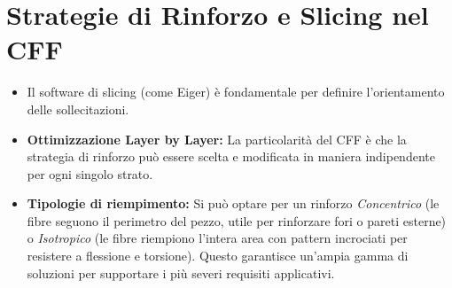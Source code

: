 \section{Strategie di Rinforzo e Slicing nel CFF}
\begin{itemize}
    \item Il software di slicing (come Eiger) è fondamentale per definire l'orientamento delle sollecitazioni.
    \item \textbf{Ottimizzazione Layer by Layer:} La particolarità del CFF è che la strategia di rinforzo può essere scelta e modificata in maniera indipendente per ogni singolo strato.
    \item \textbf{Tipologie di riempimento:} Si può optare per un rinforzo \textit{Concentrico} (le fibre seguono il perimetro del pezzo, utile per rinforzare fori o pareti esterne) o \textit{Isotropico} (le fibre riempiono l'intera area con pattern incrociati per resistere a flessione e torsione). Questo garantisce un'ampia gamma di soluzioni per supportare i più severi requisiti applicativi.
\end{itemize}